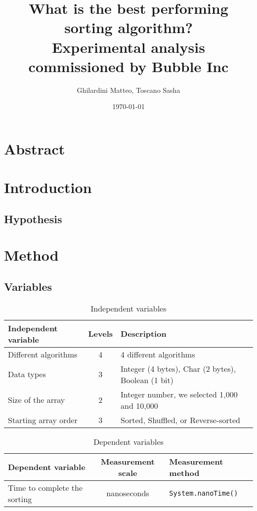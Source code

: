 \documentclass{article}
\title{What is the best performing sorting algorithm? \\ \large Experimental analysis commissioned by Bubble Inc}
\author{Ghilardini Matteo, Toscano Sasha}
\date{\today}
\begin{document}
\maketitle

\section*{Abstract}



\section{Introduction}


\subsection*{Hypothesis}


\newpage

\section{Method}
\subsection{Variables}
\begin{table}[h!]
    \centering
    \begin{tabular}{l|c|l}
        \textbf{Independent variable} & \textbf{Levels} & \textbf{Description}                               \\ \hline
        Different algorithms          & 4               & 4 different algorithms                             \\
        Data types                    & 3               & Integer (4 bytes), Char (2 bytes), Boolean (1 bit) \\
        Size of the array             & 2               & Integer number, we selected 1,000 and 10,000       \\
        Starting array order          & 3               & Sorted, Shuffled, or Reverse-sorted                \\
    \end{tabular}
    \caption{Independent variables}
\end{table}

\begin{table}[h!]
    \centering
    \begin{tabular}{l|c|l}
        \textbf{Dependent variable}  & \textbf{Measurement scale} & \textbf{Measurement method} \\
        \hline
        Time to complete the sorting & nanoseconds                & \texttt{System.nanoTime()}  \\
    \end{tabular}
    \caption{Dependent variables}
\end{table}
\end{document}
